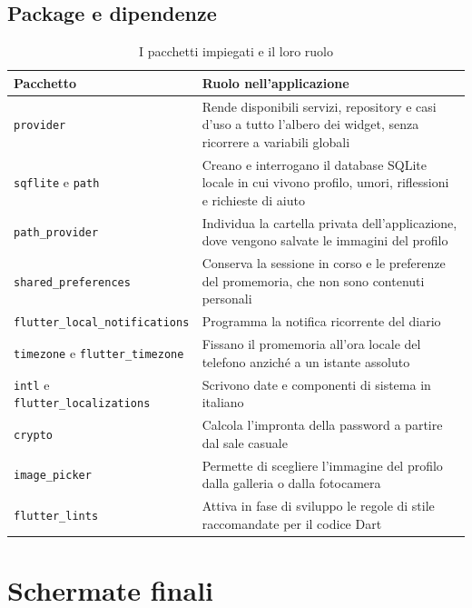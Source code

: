 \subsection{Package e dipendenze}
\label{subsec:package}

\begin{table}[htbp]
    \centering
    \small
    \renewcommand{\arraystretch}{1.3}
    \begin{tabularx}{\textwidth}{L{5.3cm} X}
        \toprule
        \textbf{Pacchetto} & \textbf{Ruolo nell'applicazione} \\
        \midrule
        \texttt{provider} & Rende disponibili servizi, repository e casi d'uso a tutto l'albero dei widget, senza ricorrere a variabili globali \\
        \texttt{sqflite} e \texttt{path} & Creano e interrogano il database SQLite locale in cui vivono profilo, umori, riflessioni e richieste di aiuto \\
        \texttt{path\_provider} & Individua la cartella privata dell'applicazione, dove vengono salvate le immagini del profilo \\
        \texttt{shared\_preferences} & Conserva la sessione in corso e le preferenze del promemoria, che non sono contenuti personali \\
        \texttt{flutter\_local\_notifications} & Programma la notifica ricorrente del diario \\
        \texttt{timezone} e \texttt{flutter\_timezone} & Fissano il promemoria all'ora locale del telefono anziché a un istante assoluto \\
        \texttt{intl} e \texttt{flutter\_localizations} & Scrivono date e componenti di sistema in italiano \\
        \texttt{crypto} & Calcola l'impronta della password a partire dal sale casuale \\
        \texttt{image\_picker} & Permette di scegliere l'immagine del profilo dalla galleria o dalla fotocamera \\
        \texttt{flutter\_lints} & Attiva in fase di sviluppo le regole di stile raccomandate per il codice Dart \\
        \bottomrule
    \end{tabularx}
    \caption{I pacchetti impiegati e il loro ruolo}
    \label{tab:pacchetti}
\end{table}

\section{Schermate finali}
\label{sec:schermate-finali}


